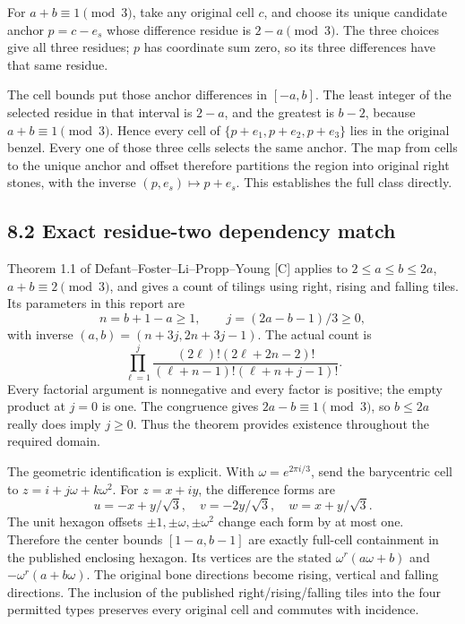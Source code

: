 \documentclass[
  11pt,
]{article}
\begin{document}
For \(a+b\equiv1\pmod3\), take any original cell \(c\), and choose its
unique candidate anchor \(p=c-e_s\) whose difference residue is
\(2-a\pmod3\). The three choices give all three residues; \(p\) has
coordinate sum zero, so its three differences have that same residue.

The cell bounds put those anchor differences in \([-a,b]\). The least
integer of the selected residue in that interval is \(2-a\), and the
greatest is \(b-2\), because \(a+b\equiv1\pmod3\). Hence every cell of
\(\{p+e_1,p+e_2,p+e_3\}\) lies in the original benzel. Every one of
those three cells selects the same anchor. The map from cells to the
unique anchor and offset therefore partitions the region into original
right stones, with the inverse \((p,e_s)\mapsto p+e_s\). This
establishes the full class directly.

\subsection{8.2 Exact residue-two dependency
match}\label{exact-residue-two-dependency-match}

Theorem 1.1 of Defant--Foster--Li--Propp--Young {[}C{]} applies to
\(2\le a\le b\le2a\), \(a+b\equiv2\pmod3\), and gives a count of tilings
using right, rising and falling tiles. Its parameters in this report are
\[
n=b+1-a\ge1,\qquad j=(2a-b-1)/3\ge0,
\] with inverse \((a,b)=(n+3j,2n+3j-1)\). The actual count is \[
\prod_{\ell=1}^{j}
\frac{(2\ell)!(2\ell+2n-2)!}
{(\ell+n-1)!(\ell+n+j-1)!}.
\] Every factorial argument is nonnegative and every factor is positive;
the empty product at \(j=0\) is one. The congruence gives
\(2a-b\equiv1\pmod3\), so \(b\le2a\) really does imply \(j\ge0\). Thus
the theorem provides existence throughout the required domain.

The geometric identification is explicit. With \(\omega=e^{2\pi i/3}\),
send the barycentric cell to \(z=i+j\omega+k\omega^2\). For \(z=x+iy\),
the difference forms are \[
u=-x+y/\sqrt3,\quad v=-2y/\sqrt3,\quad w=x+y/\sqrt3.
\] The unit hexagon offsets \(\pm1,\pm\omega,\pm\omega^2\) change each
form by at most one. Therefore the center bounds \([1-a,b-1]\) are
exactly full-cell containment in the published enclosing hexagon. Its
vertices are the stated \(\omega^r(a\omega+b)\) and
\(-\omega^r(a+b\omega)\). The original bone directions become rising,
vertical and falling directions. The inclusion of the published
right/rising/falling tiles into the four permitted types preserves every
original cell and commutes with incidence.
\end{document}
